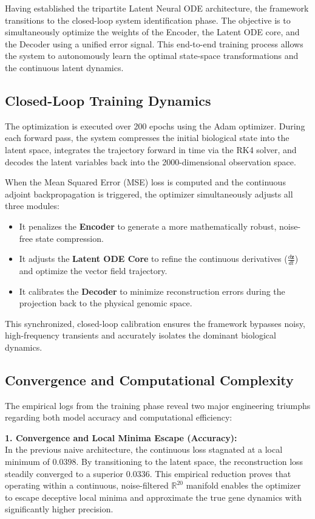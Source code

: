 \documentclass[12pt, a4paper]{article}
\begin{document}
	Having established the tripartite Latent Neural ODE architecture, the framework transitions to the closed-loop system identification phase. The objective is to simultaneously optimize the weights of the Encoder, the Latent ODE core, and the Decoder using a unified error signal. This end-to-end training process allows the system to autonomously learn the optimal state-space transformations and the continuous latent dynamics.
	
	\subsection{Closed-Loop Training Dynamics}
	The optimization is executed over 200 epochs using the Adam optimizer. During each forward pass, the system compresses the initial biological state into the latent space, integrates the trajectory forward in time via the RK4 solver, and decodes the latent variables back into the 2000-dimensional observation space. 
	
	When the Mean Squared Error (MSE) loss is computed and the continuous adjoint backpropagation is triggered, the optimizer simultaneously adjusts all three modules:
	\begin{itemize}
		\item It penalizes the \textbf{Encoder} to generate a more mathematically robust, noise-free state compression.
		\item It adjusts the \textbf{Latent ODE Core} to refine the continuous derivatives ($\frac{d\mathbf{z}}{dt}$) and optimize the vector field trajectory.
		\item It calibrates the \textbf{Decoder} to minimize reconstruction errors during the projection back to the physical genomic space.
	\end{itemize}
	This synchronized, closed-loop calibration ensures the framework bypasses noisy, high-frequency transients and accurately isolates the dominant biological dynamics.
	
	\subsection{Convergence and Computational Complexity}
	The empirical logs from the training phase reveal two major engineering triumphs regarding both model accuracy and computational efficiency:
	
	\vspace{0.3cm}
	\noindent \textbf{1. Convergence and Local Minima Escape (Accuracy):} \\
	In the previous naive architecture, the continuous loss stagnated at a local minimum of $0.0398$. By transitioning to the latent space, the reconstruction loss steadily converged to a superior $0.0336$. This empirical reduction proves that operating within a continuous, noise-filtered $\mathbb{R}^{20}$ manifold enables the optimizer to escape deceptive local minima and approximate the true gene dynamics with significantly higher precision.
	
\end{document}
